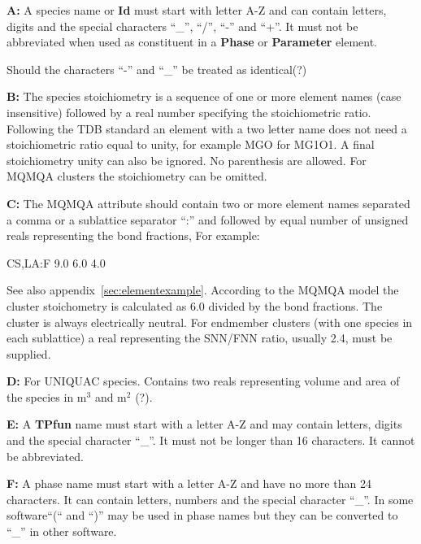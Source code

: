 \documentclass{article}
\begin{document}
\begin{description}
\item{\bf A:}\label{sec:noteA} A species name or {\bf Id} must start
  with letter A-Z and can contain letters, digits and the special
  characters ``\_'', ``/'', ``-'' and ``+''.  It must not be
  abbreviated when used as constituent in a {\bf Phase} or {\bf
    Parameter} element.

  Should the characters ``-'' and ``\_'' be treated as identical(?)

\item{\bf B:} The species stoichiometry is a sequence of one or more
  element names (case insensitive) followed by a real number
  specifying the stoichiometric ratio.  Following the TDB standard an
  element with a two letter name does not need a stoichiometric ratio
  equal to unity, for example MGO for MG1O1.  A final stoichiometry
  unity can also be ignored.  No parenthesis are allowed.  For MQMQA
  clusters the stoichiometry can be omitted.

\item{\bf C:} The MQMQA attribute should contain two or more element
  names separated a comma or a sublattice separator ``:'' and
  followed by equal number of unsigned reals representing the bond
  fractions, For example:

  CS,LA:F  9.0 6.0 4.0

  See also appendix~\ref{sec:elementexample}.  According to the MQMQA
  model the cluster stoichometry is calculated as 6.0 divided by the
  bond fractions.  The cluster is always electrically neutral.  For
  endmember clusters (with one species in each sublattice) a real
  representing the SNN/FNN ratio, usually 2.4, must be supplied.

\item{\bf D:} For UNIQUAC species.  Contains two reals representing
  volume and area of the species in m$^3$ and m$^2$ (?).

\item{\bf E:} A {\bf TPfun} name must start with a letter A-Z and may
  contain letters, digits and the special character ``\_''.  It must
  not be longer than 16 characters.  It cannot be abbreviated.

\item{\bf F:} A phase name must start with a letter A-Z and have no
  more than 24 characters.  It can contain letters, numbers and the
  special character ``\_''.  In some software``(`` and ``)'' may be
  used in phase names but they can be converted to ``\_'' in other
  software.


\end{description}
\end{document}
